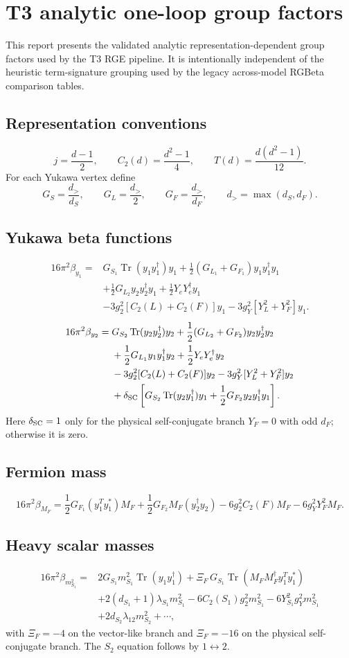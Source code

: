 \documentclass[11pt]{article}
\begin{document}
\section*{T3 analytic one-loop group factors}
This report presents the validated analytic representation-dependent group factors used by the T3 RGE pipeline.  It is intentionally independent of the heuristic term-signature grouping used by the legacy across-model RGBeta comparison tables.
\subsection*{Representation conventions}
\[
j=\frac{d-1}{2},\qquad
C_2(d)=\frac{d^2-1}{4},\qquad
T(d)=\frac{d(d^2-1)}{12}.
\]
For each Yukawa vertex define
\[
G_S=\frac{d_>}{d_S},\qquad
G_L=\frac{d_>}{2},\qquad
G_F=\frac{d_>}{d_F},\qquad
d_>=\max(d_S,d_F).
\]
\subsection*{Yukawa beta functions}
\[
\begin{aligned}
16\pi^2\beta_{y_1}={}&
G_{S_1}\operatorname{Tr}(y_1y_1^\dagger)y_1
+\frac12(G_{L_1}+G_{F_1})y_1y_1^\dagger y_1\\
&+\frac12G_{L_2}y_2y_2^\dagger y_1
+\frac12Y_eY_e^\dagger y_1\\
&-3g_2^2[C_2(L)+C_2(F)]y_1
-3g_Y^2[Y_L^2+Y_F^2]y_1 .
\end{aligned}
\]
\[
\begin{aligned}
16\pi^2\beta_{y_2}={}&
G_{S_2}\operatorname{Tr}(y_2y_2^\dagger)y_2
+\frac12(G_{L_2}+G_{F_2})y_2y_2^\dagger y_2\\
&+\frac12G_{L_1}y_1y_1^\dagger y_2
+\frac12Y_eY_e^\dagger y_2\\
&-3g_2^2[C_2(L)+C_2(F)]y_2
-3g_Y^2[Y_L^2+Y_F^2]y_2\\
&+\delta_{\rm SC}\left[
G_{S_2}\operatorname{Tr}(y_2y_1^\dagger)y_1
+\frac12G_{F_2}y_2y_1^\dagger y_1
\right].
\end{aligned}
\]
Here $\delta_{\rm SC}=1$ only for the physical self-conjugate branch $Y_F=0$ with odd $d_F$; otherwise it is zero.
\subsection*{Fermion mass}
\[
16\pi^2\beta_{M_F}
=
\frac12G_{F_1}(y_1^Ty_1^*)M_F
+\frac12G_{F_2}M_F(y_2^\dagger y_2)
-6g_2^2C_2(F)M_F
-6g_Y^2Y_F^2M_F .
\]
\subsection*{Heavy scalar masses}
\[
\begin{aligned}
16\pi^2\beta_{m_{S_1}^2}={}&
2G_{S_1}m_{S_1}^2\operatorname{Tr}(y_1y_1^\dagger)
+\Xi_F\,G_{S_1}\operatorname{Tr}(M_FM_F^\dagger y_1^Ty_1^*)\\
&+2(d_{S_1}+1)\lambda_{S_1}m_{S_1}^2
-6C_2(S_1)g_2^2m_{S_1}^2
-6Y_{S_1}^2g_Y^2m_{S_1}^2\\
&+2d_{S_2}\lambda_{12}m_{S_2}^2+\cdots ,
\end{aligned}
\]
with $\Xi_F=-4$ on the vector-like branch and $\Xi_F=-16$ on the physical self-conjugate branch.  The $S_2$ equation follows by $1\leftrightarrow2$.
\end{document}
